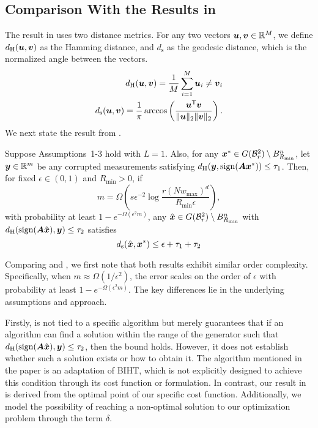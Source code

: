 \documentclass[journal]{IEEEtran}
\DeclareMathOperator{\sign}{sign}
\begin{document}
\subsection{Comparison With the Results in \cite{liu2020sample}}
The result in \cite{liu2020sample} uses two distance metrics. For any two vectors $\boldsymbol{u},\boldsymbol{v}\in\mathbb{R}^M$, we define $d_{\mathrm{H}}(\boldsymbol{u},\boldsymbol{v})$ as the Hamming distance, and $d_{\mathrm{s}}$ as the geodesic distance, which is the normalized angle
between the vectors.
\begin{align}
\label{eq:Hamming}
   d_{\mathrm{H}}(\boldsymbol{u},\boldsymbol{v}) =\frac{1}{M}\sum_{i=1}^M\boldsymbol{u}_i\neq \boldsymbol{v}_i\\
d_{\mathrm{s}}(\boldsymbol{u},\boldsymbol{v}) =\frac{1}{\pi} \arccos\left(\frac{\boldsymbol{u}^{\mathsf{T}}\boldsymbol{v}}{\|\boldsymbol{u}\|_2\|\boldsymbol{v}\|_2} \right).
\end{align}
We next state the result from  \cite{liu2020sample}.
\begin{prop}\label{prop:liu_result}
Suppose Assumptions~1-3 hold with $L=1$. Also, for any $\boldsymbol{x}^* \in G(\mathcal{B}_r^2) \setminus B_{R_{\min}}^n$,  let $\boldsymbol{y}\in\mathbb{R}^{m}$ be any corrupted measurements satisfying $d_{\mathrm{H}}(\vecy, \sign(\matA\vecx^*)) \leq \tau_1$. Then, for fixed $\epsilon \in (0, 1)$ and $R_{\min} > 0$, if
\begin{equation}
m = \Omega\left( s \epsilon^{-2} \log \frac{r (N w_{\max})^d}{ R_{\min}\epsilon} \right),
\end{equation}
with probability at least $1 - e^{-\Omega(\epsilon^2 m)}$, any $\hat{\boldsymbol{x}} \in G(\mathcal{B}_r^2) \setminus B_{R_{\min}}^n$ with $ d_{\mathrm{H}}(\sign(\matA\hat{\vecx}), \vecy) \le \tau_2$ satisfies
\begin{equation}
d_{\mathrm{s}}(\hat{\boldsymbol{x}},\boldsymbol{x}^*) \leq \epsilon + \tau_1 + \tau_2
\end{equation} 
\end{prop}

Comparing  and , we first note that both results exhibit similar order complexity. Specifically, when $m \approx \Omega(1/\epsilon^2)$, the error scales on the order of $\epsilon$ with probability at least $1 - e^{-\Omega(\epsilon^2 m)}$. The key differences lie in the underlying assumptions and approach.

Firstly,  is not tied to a specific algorithm but merely guarantees that if an algorithm can find a solution within the range of the generator such that  
$d_{\mathrm{H}}(\sign(\matA\hat{\vecx}), \vecy) \leq \tau_2$,   
then the bound holds. However, it does not establish whether such a solution exists or how to obtain it. The algorithm mentioned in the paper is an adaptation of BIHT, which is not explicitly designed to achieve this condition through its cost function or formulation. In contrast, our result in  is derived from the optimal point of our specific cost function. Additionally, we model the possibility of reaching a non-optimal solution to our optimization problem through the term $\delta$.
\end{document}
